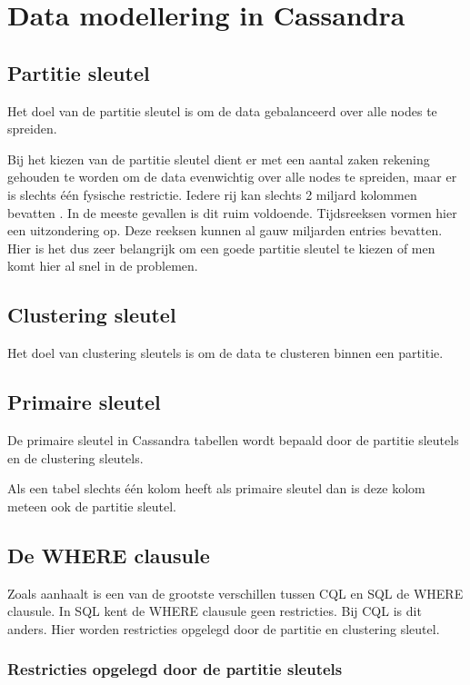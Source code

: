 \chapter{Data modellering in Cassandra}
\label{ch:cassandra_modelling}

\section{Partitie sleutel}
Het doel van de partitie sleutel is om de data gebalanceerd over alle nodes te spreiden.

Bij het kiezen van de partitie sleutel dient er met een aantal zaken rekening gehouden te worden om de data evenwichtig over alle nodes te spreiden, maar er is slechts één fysische restrictie.
Iedere rij kan slechts 2 miljard kolommen bevatten \citep{McFadin2013Timeseries}.
In de meeste gevallen is dit ruim voldoende.
Tijdsreeksen vormen hier een uitzondering op.
Deze reeksen kunnen al gauw miljarden entries bevatten.
Hier is het dus zeer belangrijk om een goede partitie sleutel te kiezen of men komt hier al snel in de problemen.

\section{Clustering sleutel}
Het doel van clustering sleutels is om de data te clusteren binnen een partitie.

\section{Primaire sleutel}
De primaire sleutel in Cassandra tabellen wordt bepaald door de partitie sleutels en de clustering sleutels.

Als een tabel slechts één kolom heeft als primaire sleutel dan is deze kolom meteen ook de partitie sleutel.

\section{De WHERE clausule}
Zoals \cite{Lerer2015Where} aanhaalt is een van de grootste verschillen tussen CQL en SQL de WHERE clausule.
In SQL kent de WHERE clausule geen restricties.
Bij CQL is dit anders.
Hier worden restricties opgelegd door de partitie en clustering sleutel.

\subsection{Restricties opgelegd door de partitie sleutels}

